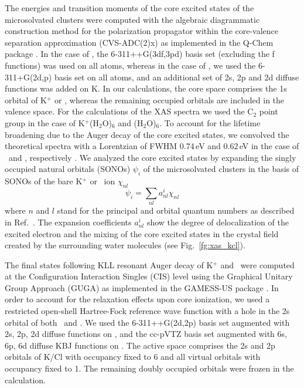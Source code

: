 The energies and transition moments of the core excited states of the microsolvated clusters were computed with the algebraic diagrammatic construction method for the polarization propagator \citep{sch82:2395} within the core-valence separation approximation \citep{bar85:867,ced80:206,ced81:1038} (CVS-ADC(2)x) as implemented in the Q-Chem package \citep{Wenzel14:1900,Wenzel14:4583,Wormit14:774,QChem2015}. In the case of \cli, the 6-311++G(3df,3pd) basis set \citep{Krishnan80:650,McLean80:5639} (excluding the f functions) was used on all atoms, whereas in the case of \ki, we used the 6-311+G(2d,p) basis set \citep{Krishnan80:650,Blaudeau97:5016} on all atoms, and an additional set of 2s, 2p and 2d diffuse functions was added on K. In our calculations, the core space comprises the 1s orbital of K$^{+}$ or \cli, whereas the remaining occupied orbitals are included in the valence space. For the calculations of the XAS spectra we used the C$_2$ point group in the case of K$^{+}$(H$_2$O)$_6$ and \cli(H$_2$O)$_6$. To account for the lifetime broadening due to the Auger decay of the core excited states, we convolved the theoretical spectra with a Lorentzian of FWHM 0.74\,eV and 0.62\,eV in the case of \ki~and \cli, respectively \citep{Krause79:329}. We analyzed the core excited states by expanding the singly occupied natural orbitals (SONOs) $\psi_{i}$ of the microsolvated clusters in the basis of SONOs of the bare K$^{+}$ or \cli~ion $\chi_{nl}$
%
\begin{equation}\label{eq:sono_proj}
\psi_{i} = \sum_{nl} a^{i}_{nl} \chi_{nl}
\end{equation}
%
where $n$ and $l$ stand for the principal and orbital quantum numbers as described in Ref.\ \citep{miteva16:16671}. The expansion coefficients $a^{i}_{nl}$ show the degree of delocalization of the excited electron and the mixing of the core excited states in the crystal field created by the surrounding water molecules (see Fig.\ \ref{fg:xas_kcl}).


The final states following KLL resonant Auger decay of K$^{+}$ and \cli~were computed at the Configuration Interaction Singles (CIS) level using the Graphical Unitary Group Approach (GUGA) as implemented in the GAMESS-US package \citep{GUGA_PhysScr_21,GUGA_JCP_70,GUS}. In order to account for the relaxation effects upon core ionization, we used a restricted open-shell Hartree-Fock reference wave function with a hole in the 2s orbital of both \ki~and \cli.  We used the 6-311++G(2d,2p) basis set \citep{Blaudeau97:5016} augmented with 2s, 2p, 2d diffuse functions on \ki, and the cc-pVTZ basis set augmented with 6s, 6p, 6d diffuse KBJ functions \citep{Kaufmann89:2223} on \cli. The active space comprises the 2s and 2p orbitals of K/Cl with occupancy fixed to 6 and all virtual orbitals with occupancy fixed to 1. The remaining doubly occupied orbitals were frozen in the calculation. \citep{mosnier16:061401}